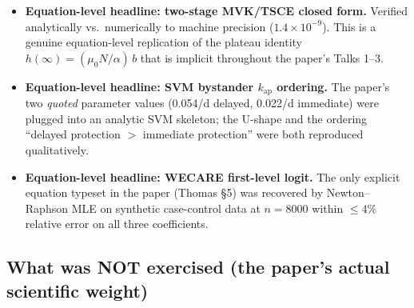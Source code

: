 \documentclass[11pt]{article}
\begin{document}
\begin{itemize}
\item \textbf{Equation-level headline: two-stage MVK/TSCE closed form.}
      Verified analytically vs.\ numerically to machine precision
      ($1.4\times 10^{-9}$). This is a genuine equation-level replication
      of the plateau identity $h(\infty)=(\mu_0 N/\alpha)\,b$ that is
      implicit throughout the paper's Talks 1--3.
\item \textbf{Equation-level headline: SVM bystander $k_{\mathrm{ap}}$ ordering.}
      The paper's two \emph{quoted} parameter values (0.054/d delayed,
      0.022/d immediate) were plugged into an analytic SVM skeleton;
      the U-shape and the ordering ``delayed protection $>$ immediate
      protection'' were both reproduced qualitatively.
\item \textbf{Equation-level headline: WECARE first-level logit.}
      The only explicit equation typeset in the paper (Thomas §5) was
      recovered by Newton--Raphson MLE on synthetic case-control data at
      $n=8000$ within $\leq 4\%$ relative error on all three coefficients.
\end{itemize}

\subsection{What was NOT exercised (the paper's actual scientific weight)}
\end{document}
